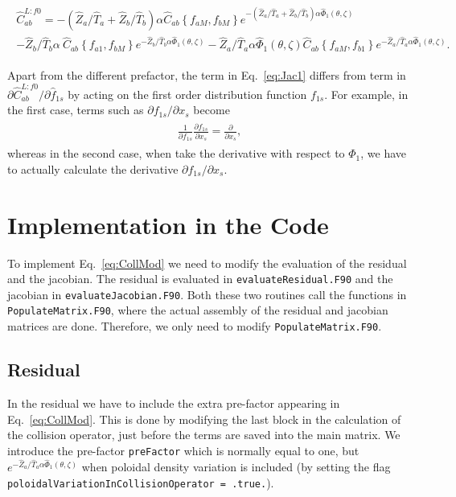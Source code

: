\documentclass[12pt]{article}
\newcommand{\eq}[1]{\begin{align*}\begin{gathered}#1\end{gathered}\end{align*}}
\newcommand{\eqre}[1]{\begin{align}\begin{gathered}#1\end{gathered}\end{align}}
\begin{document}
\eqre{
\label{eq:Jac1}
\hat C_{ab}^{L:f0} = -\left(\hat Z_a/\hat T_a + \hat Z_b/\hat T_b\right) \alpha \hat C_{ab}\left\{f_{aM},f_{bM}\right\}e^{-\left(\hat Z_a/\hat T_a + \hat Z_b/\hat T_b\right) \alpha\hat\Phi_1(\theta,\zeta)}  \\ -\hat Z_b/\hat T_b \alpha\ \hat C_{ab}\left\{f_{a1},f_{bM}\right\}e^{-\hat Z_b/\hat T_b \alpha\hat\Phi_1(\theta,\zeta)}  - \hat Z_a/\hat T_a\alpha\hat\Phi_1(\theta,\zeta) \hat C_{ab}\left\{f_{aM},f_{b1}\right\}e^{-\hat Z_a/\hat T_a\alpha\hat\Phi_1(\theta,\zeta)}.
}

\noindent
Apart from the different prefactor, the term in Eq.~\eqref{eq:Jac1} differs from term in $\partial \hat C_{ab}^{L:f0}/\partial \hat f_{1s}$ by acting on the first order distribution function $f_{1s}$. For example, in the first case, terms such as $\partial f_{1s}/\partial x_s$ become 
\eq{
\frac{1}{\partial f_{1s}}\frac{\partial f_{1s}}{\partial x_s} = \frac{\partial}{\partial x_s},
}
whereas in the second case, when take the derivative with respect to $\Phi_1$, we have to actually calculate the derivative $\partial f_{1s}/\partial x_s$.


\section*{Implementation in the Code}
To implement Eq.~\eqref{eq:CollMod} we need to modify the evaluation of the residual and the jacobian. The residual is evaluated in \texttt{evaluateResidual.F90} and the jacobian in \texttt{evaluateJacobian.F90}. Both these two routines call the functions in \texttt{PopulateMatrix.F90}, where the actual assembly of the residual and jacobian matrices are done. Therefore, we only need to modify \texttt{PopulateMatrix.F90}.


\subsection*{Residual}
\label{sec:Res}
In the residual we have to include the extra pre-factor appearing in Eq.~\eqref{eq:CollMod}. This is done by modifying the last block in the calculation of the collision operator, just before the terms are saved into the main matrix. We introduce the pre-factor \texttt{preFactor} which is normally equal to one, but $e^{-\hat Z_a/\hat T_a \alpha\hat\Phi_1(\theta,\zeta)}$ when poloidal density variation is included (by setting the flag \texttt{poloidalVariationInCollisionOperator = .true.}). 
\end{document}
